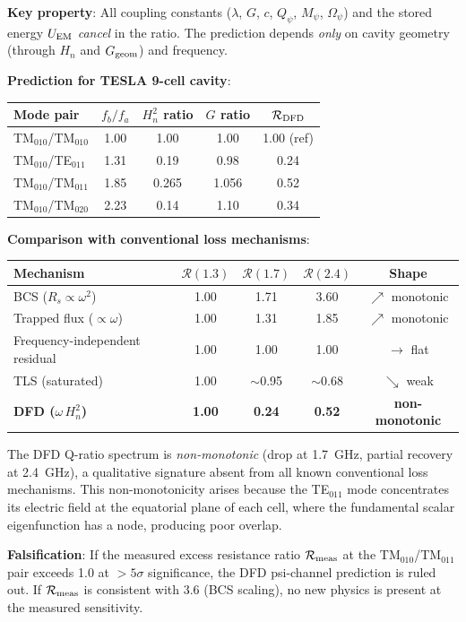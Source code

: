\documentclass[11pt]{article}
\theoremstyle{definition}
\theoremstyle{remark}
\begin{document}
\begin{tcolorbox}[colback=white, colframe=black,
  title=\textbf{PROPOSAL TEXT --- Extract verbatim for SQMS Phase I},
  breakable]
\textbf{Key property}: All coupling constants ($\lambda$, $G$, $c$,
$Q_\psi$, $M_\psi$, $\Omega_\psi$) and the stored energy $U_{\rm EM}$
\emph{cancel} in the ratio. The prediction depends \emph{only} on
cavity geometry (through $H_n$ and $G_{\rm geom}$) and frequency.

\textbf{Prediction for TESLA 9-cell cavity}:
\begin{center}
\renewcommand{\arraystretch}{1.2}
\begin{tabular}{@{}lcccc@{}}
\toprule
\textbf{Mode pair} & $f_b/f_a$ & $H_n^2$ ratio & $G$ ratio
& $\mathcal{R}_{\rm DFD}$ \\
\midrule
TM$_{010}$/TM$_{010}$ & 1.00 & 1.00 & 1.00 & 1.00 (ref) \\
TM$_{010}$/TE$_{011}$ & 1.31 & 0.19 & 0.98 & 0.24 \\
TM$_{010}$/TM$_{011}$ & 1.85 & 0.265 & 1.056 & 0.52 \\
TM$_{010}$/TM$_{020}$ & 2.23 & 0.14 & 1.10 & 0.34 \\
\bottomrule
\end{tabular}
\end{center}

\textbf{Comparison with conventional loss mechanisms}:
\begin{center}
\renewcommand{\arraystretch}{1.2}
\begin{tabular}{@{}lcccc@{}}
\toprule
\textbf{Mechanism} & $\mathcal{R}(1.3)$ & $\mathcal{R}(1.7)$
& $\mathcal{R}(2.4)$ & Shape \\
\midrule
BCS ($R_s \propto \omega^2$) & 1.00 & 1.71 & 3.60 &
$\nearrow$ monotonic \\
Trapped flux ($\propto \omega$) & 1.00 & 1.31 & 1.85 &
$\nearrow$ monotonic \\
Frequency-independent residual & 1.00 & 1.00 & 1.00 &
$\rightarrow$ flat \\
TLS (saturated) & 1.00 & $\sim$0.95 & $\sim$0.68 &
$\searrow$ weak \\
\textbf{DFD ($\omega\,H_n^2$)} & \textbf{1.00} & \textbf{0.24}
& \textbf{0.52} & \textbf{non-monotonic} \\
\bottomrule
\end{tabular}
\end{center}

The DFD Q-ratio spectrum is \emph{non-monotonic} (drop at 1.7~GHz,
partial recovery at 2.4~GHz), a qualitative signature absent from all
known conventional loss mechanisms. This non-monotonicity arises because
the TE$_{011}$ mode concentrates its electric field at the equatorial
plane of each cell, where the fundamental scalar eigenfunction has a
node, producing poor overlap.

\textbf{Falsification}: If the measured excess resistance ratio
$\mathcal{R}_{\rm meas}$ at the TM$_{010}$/TM$_{011}$ pair exceeds
1.0 at $> 5\sigma$ significance, the DFD psi-channel prediction is
ruled out. If $\mathcal{R}_{\rm meas}$ is consistent with 3.6
(BCS scaling), no new physics is present at the measured sensitivity.

\end{tcolorbox}
\end{document}

